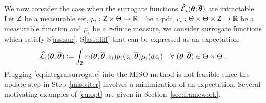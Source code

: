 \documentclass[11pt]{article}
\theoremstyle{t}
\begin{document}
We now consider the case when the surrogate functions $\sur{i}{\param}{\op}$ are intractable. 
Let $\Zset$ be a measurable set, $p_i : \Zset \times \Param \rightarrow \rset_+$ be a pdf, $r_i : \Param \times \Param \times \Zset \rightarrow \rset$ be a measurable function and $\mu_i$ be a $\sigma$-finite measure, we consider surrogate functions which satisfy S\ref{ass:sur}, S\ref{ass:diff} that can be expressed as an expectation:
\begin{equation}\label{eq:integralsurrogate}
\sur{i}{\param}{\op} \eqdef \int_{\Zset}{\rsur{i}{\param}{\op}{z_i}  p_i(z_i ; \op)\mu_i(dz_i)}\quad \forall~(\param,\op) \in \Param \times \Param \eqsp.
\end{equation}
Plugging \eqref{eq:integralsurrogate} into the MISO method is not feasible since the update step in Step~\ref{miso:iter} involves a minimization of an expectation.
Several motivating examples of \eqref{eq:opt} are given in Section~\ref{sec:framework}.
\end{document}
